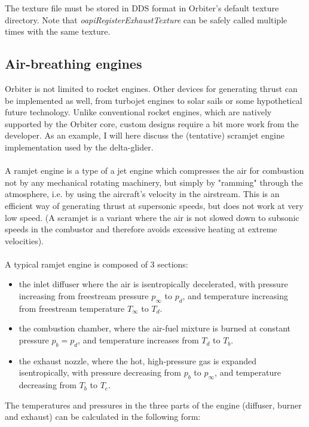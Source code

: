 \documentclass[Orbiter Developer Manual.tex]{subfiles}
\begin{document}
\noindent
The texture file must be stored in DDS format in Orbiter's default texture directory. Note that \textit{oapiRegisterExhaustTexture} can be safely called multiple times with the same texture.


\subsection{Air-breathing engines}
Orbiter is not limited to rocket engines. Other devices for generating thrust can be implemented as well, from turbojet engines to solar sails or some hypothetical future technology. Unlike conventional rocket engines, which are natively supported by the Orbiter core, custom designs require a bit more work from the developer. As an example, I will here discuss the (tentative) scramjet engine implementation used by the delta-glider.\\
\\
A ramjet engine is a type of a jet engine which compresses the air for combustion not by any mechanical rotating machinery, but simply by "ramming" through the atmosphere, i.e. by using the aircraft's velocity in the airstream. This is an efficient way of generating thrust at supersonic speeds, but does not work at very low speed. (A scramjet is a variant where the air is not slowed down to subsonic speeds in the combustor and therefore avoids excessive heating at extreme velocities).\\
\\
A typical ramjet engine is composed of 3 sections:

\begin{itemize}
\item the inlet diffuser where the air is isentropically decelerated, with pressure increasing from freestream pressure $p_{\infty}$ to $p_{d}$, and temperature increasing from freestream temperature $T_{\infty}$ to $T_{d}$.
\item the combustion chamber, where the air-fuel mixture is burned at constant pressure $p_{b} = p_{d}$, and temperature increases from $T_{d}$ to $T_{b}$.
\item the exhaust nozzle, where the hot, high-pressure gas is expanded isentropically, with pressure decreasing from $p_{b}$ to $p_{\infty}$, and temperature decreasing from $T_{b}$ to $T_{e}$.
\end{itemize}

\noindent
The temperatures and pressures in the three parts of the engine (diffuser, burner and exhaust) can be calculated in the following form:
\end{document}

